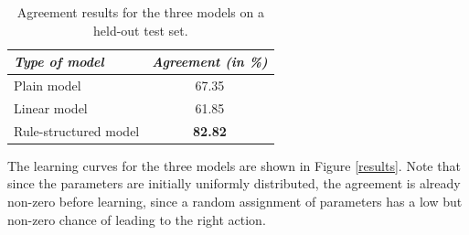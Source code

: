 \begin{table}[h]
\begin{center}
\begin{tabular}{|l|c|} \hline
\textit{Type of model} & \textit{Agreement (in \%) } \\ \hline \hline
Plain model & 67.35 \\ \hline
Linear model & 61.85 \\ \hline
Rule-structured model & \textbf{82.82} \\ \hline
\end{tabular}
\end{center}
\vspace{-2mm}
\caption{Agreement results for the three models on a held-out test set.}
\vspace{-2mm}
\label{table}
\end{table}

The learning curves for the three models are shown in Figure \ref{results}.   Note that since the parameters are initially uniformly distributed, the agreement is already non-zero before learning, since a random assignment of parameters has a low but non-zero chance of leading to the right action. 


